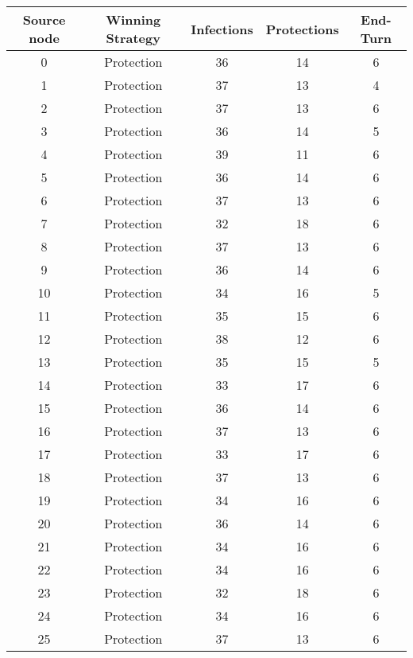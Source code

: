 \documentclass[results.tex]{subfiles}
\begin{document}
\begin{center}
  \begin{tabular}{| c || c | c | c | c |}
    \hline
    {\bfseries Source node} & {\bfseries Winning Strategy} & {\bfseries Infections} & {\bfseries Protections} & {\bfseries End-Turn} \\  %
    \hline\hline
    0 & Protection & 36 & 14 & 6 \\ 
    \hline
    1 & Protection & 37 & 13 & 4 \\ 
    \hline
    2 & Protection & 37 & 13 & 6 \\ 
    \hline
    3 & Protection & 36 & 14 & 5 \\ 
    \hline
    4 & Protection & 39 & 11 & 6 \\ 
    \hline
    5 & Protection & 36 & 14 & 6 \\ 
    \hline
    6 & Protection & 37 & 13 & 6 \\ 
    \hline
    7 & Protection & 32 & 18 & 6 \\ 
    \hline
    8 & Protection & 37 & 13 & 6 \\ 
    \hline
    9 & Protection & 36 & 14 & 6 \\ 
    \hline
    10 & Protection & 34 & 16 & 5 \\ 
    \hline
    11 & Protection & 35 & 15 & 6 \\ 
    \hline
    12 & Protection & 38 & 12 & 6 \\ 
    \hline
    13 & Protection & 35 & 15 & 5 \\ 
    \hline
    14 & Protection & 33 & 17 & 6 \\ 
    \hline
    15 & Protection & 36 & 14 & 6 \\ 
    \hline
    16 & Protection & 37 & 13 & 6 \\ 
    \hline
    17 & Protection & 33 & 17 & 6 \\ 
    \hline
    18 & Protection & 37 & 13 & 6 \\ 
    \hline
    19 & Protection & 34 & 16 & 6 \\ 
    \hline
    20 & Protection & 36 & 14 & 6 \\ 
    \hline
    21 & Protection & 34 & 16 & 6 \\ 
    \hline
    22 & Protection & 34 & 16 & 6 \\ 
    \hline
    23 & Protection & 32 & 18 & 6 \\ 
    \hline
    24 & Protection & 34 & 16 & 6 \\ 
    \hline
    25 & Protection & 37 & 13 & 6 \\ 

\end{tabular}
\end{center}
\end{document}

